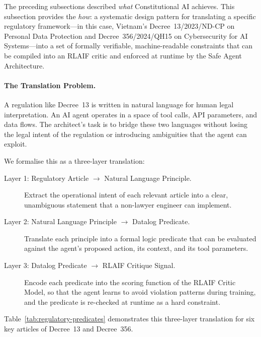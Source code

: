 The preceding subsections described \emph{what} Constitutional
AI achieves.
This subsection provides the \emph{how}: a systematic design
pattern for translating a specific regulatory framework---in
this case, Vietnam's Decree~13/2023/ND-CP on Personal Data
Protection and Decree~356/2024/QH15 on Cybersecurity for AI
Systems---into a set of formally verifiable, machine-readable
constraints that can be compiled into an RLAIF critic and
enforced at runtime by the Safe Agent Architecture.

\paragraph{The Translation Problem.}
A regulation like Decree~13 is written in natural language for
human legal interpretation.
An AI agent operates in a space of tool calls, API parameters,
and data flows.
The architect's task is to bridge these two languages without
losing the legal intent of the regulation or introducing
ambiguities that the agent can exploit.

We formalise this as a three-layer translation:

\begin{description}
  \item[Layer 1: Regulatory Article $\to$ Natural Language
    Principle.]
    Extract the operational intent of each relevant article
    into a clear, unambiguous statement that a non-lawyer
    engineer can implement.

  \item[Layer 2: Natural Language Principle $\to$ Datalog
    Predicate.]
    Translate each principle into a formal logic predicate that
    can be evaluated against the agent's proposed action, its
    context, and its tool parameters.

  \item[Layer 3: Datalog Predicate $\to$ RLAIF Critique Signal.]
    Encode each predicate into the scoring function of the
    RLAIF Critic Model, so that the agent learns to avoid
    violation patterns during training, and the predicate is
    re-checked at runtime as a hard constraint.
\end{description}

Table~\ref{tab:regulatory-predicates} demonstrates this
three-layer translation for six key articles of Decree~13
and Decree~356.

